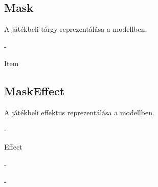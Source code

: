 \subsection{Mask}
\begin{class-template-responsibility}
    A játékbeli tárgy reprezentálása a modellben.
\end{class-template-responsibility}
\begin{class-template-interface}
    -
\end{class-template-interface}
\begin{class-template-baseclass}
    Item
\end{class-template-baseclass}
\begin{class-template-attribute}
\end{class-template-attribute}
\begin{class-template-method}
\end{class-template-method}

\subsection{MaskEffect}
\begin{class-template-responsibility}
    A játékbeli effektus reprezentálása a modellben.
\end{class-template-responsibility}
\begin{class-template-interface}
    -
\end{class-template-interface}
\begin{class-template-baseclass}
    Effect
\end{class-template-baseclass}
\begin{class-template-attribute}
    -
\end{class-template-attribute}
\begin{class-template-method}
    -
\end{class-template-method}

